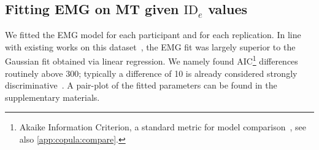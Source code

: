 \documentclass[acmlarge, manuscript,review]{acmart}
\newcommand{\ide}{\ensuremath{{\text{ID}_e}}\xspace}
\begin{document}

\subsection{Fitting EMG on MT given \ide values \label{subs:jgp:emg}}
We fitted the EMG model for each participant and for each replication. In line with existing works on this dataset~\cite{gori2018these,zhao2022}, the EMG fit was largely superior to the Gaussian fit obtained via linear regression. We namely found AIC\footnote{Akaike Information Criterion, a standard metric for model comparison~\cite{anderson2004}, see also \autoref{app:copula:compare}.} differences routinely above 300; typically a difference of 10 is already considered strongly discriminative~\cite{anderson2004}. A pair-plot of the fitted parameters can be found in the supplementary materials.

\end{document}
